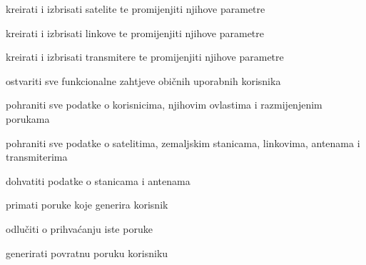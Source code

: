 \begin{packed_enum}
				    \begin{packed_enum}
					
				        \item kreirati i izbrisati satelite te promijenjiti njihove parametre
				        \item kreirati i izbrisati linkove te promijenjiti njihove parametre
				        \item kreirati i izbrisati transmitere te promijenjiti njihove parametre
				        \item ostvariti sve funkcionalne zahtjeve običnih uporabnih korisnika
					
				    \end{packed_enum}
				
					\item  {}
				
				\begin{packed_enum}
					
					\item pohraniti sve podatke o korisnicima, njihovim ovlastima i razmijenjenim porukama
					\item pohraniti sve podatke o satelitima, zemaljskim stanicama, linkovima, antenama i transmiterima
					
				\end{packed_enum}
				\item  {}
				
				\begin{packed_enum}
					
					\item dohvatiti podatke o stanicama i antenama
					
					
				\end{packed_enum}
				\item  {}
			
			\begin{packed_enum}
				
				\item primati poruke koje generira korisnik
				\item odlučiti o prihvaćanju iste poruke
				\item generirati povratnu poruku korisniku
				
				
			\end{packed_enum}
			\end{packed_enum}
			
			\eject 
			
